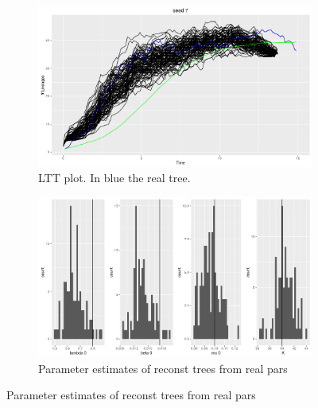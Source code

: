 \documentclass[10pt,a4paper]{article}
\begin{document}
\begin{figure}[t!] %
\begin{subfigure}{0.48\textwidth}
\includegraphics[width=\linewidth]{ph3.png}
\caption{LTT plot. In blue the real tree.} \label{fig:a}
\end{subfigure}\hspace*{\fill}
\begin{subfigure}{0.48\textwidth}
\includegraphics[width=\linewidth]{ph4.png}
\caption{Parameter estimates of reconst trees from real pars} \label{fig:b}
\end{subfigure}


\end{figure}
\end{document}
